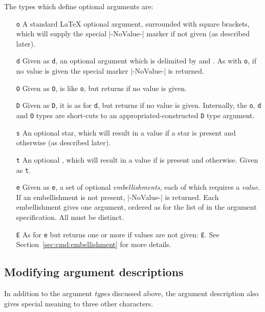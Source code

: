 \documentclass{ltxguide}
\begin{document}
The types which define optional arguments are:
\begin{itemize}
  \item[\texttt{o}] A standard \LaTeX{} optional argument, surrounded with square
    brackets, which will supply the special |-NoValue-| marker if not given
    (as described later).
  \item[\texttt{d}] Given as \texttt{d}, an optional
    argument which is delimited by  and . As with
    \texttt{o}, if no value is given the special marker |-NoValue-| is
    returned.
  \item[\texttt{O}] Given as \texttt{O}, is like \texttt{o}, but returns
     if no value is given.
  \item[\texttt{D}] Given as \texttt{D}, it is
    as for \texttt{d}, but returns  if no value is given.
    Internally, the \texttt{o}, \texttt{d} and \texttt{O} types are
    short-cuts to an appropriated-constructed \texttt{D} type argument.
  \item[\texttt{s}] An optional star, which will result in a value
     if a star is present and 
    otherwise (as described later).
  \item[\texttt{t}] An optional , which will result in a value
     if  is present and 
    otherwise. Given as \texttt{t}.
  \item[\texttt{e}] Given as \texttt{e}, a set of optional
    \emph{embellishments}, each of which requires a \emph{value}.
    If an embellishment is not present, |-NoValue-| is returned.  Each
    embellishment gives one argument, ordered as for the list of
     in the argument specification.  All 
    must be distinct.
  \item[\texttt{E}] As for \texttt{e} but returns one or more 
    if values are not given: \texttt{E}. See
    Section~\ref{sec:cmd:embellishment} for more details.
\end{itemize}

\subsection{Modifying argument descriptions}

In addition to the argument \emph{types} discussed above, the argument
description also gives special meaning to three other characters.
\end{document}
